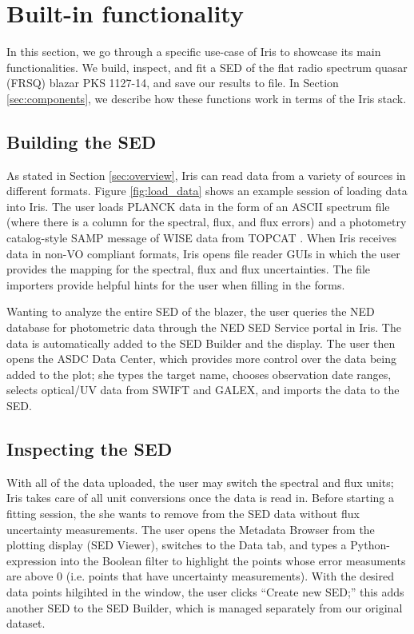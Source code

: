 \section{Built-in functionality}
\label{sec:builtin}

In this section, we go through a specific use-case of Iris to showcase its main functionalities. We build, inspect, and fit a SED of the flat radio spectrum quasar (FRSQ) blazar PKS 1127-14, and save our results to file. In Section \ref{sec:components}, we describe how these functions work in terms of the Iris stack.

\subsection{Building the SED}

As stated in Section \ref{sec:overview}, Iris can read data from a variety of sources in different formats. Figure \ref{fig:load_data} shows an example session of loading data into Iris. The user loads PLANCK data in the form of an ASCII spectrum file (where there is a column for the spectral, flux, and flux errors) and a photometry catalog-style SAMP message of WISE data from TOPCAT \citep{2005ASPC..347...29T}. When Iris receives data in non-VO compliant formats, Iris opens file reader GUIs in which the user provides the mapping for the spectral, flux and flux uncertainties. The file importers provide helpful hints for the user when filling in the forms.

Wanting to analyze the entire SED of the blazer, the user queries the NED database for photometric data through the NED SED Service portal in Iris. The data is automatically added to the SED Builder and the display. The user then opens the ASDC Data Center, which provides more control over the data being added to the plot; she types the target name, chooses observation date ranges, selects optical/UV data from SWIFT and GALEX, and imports the data to the SED.

\subsection{Inspecting the SED}

With all of the data uploaded, the user may switch the spectral and flux units; Iris takes care of all unit conversions once the data is read in. Before starting a fitting session, the she wants to remove from the SED data without flux uncertainty measurements. The user opens the Metadata Browser from the plotting display (SED Viewer), switches to the Data tab, and types a Python-expression into the Boolean filter to highlight the points whose error measuments are above 0 (i.e. points that have uncertainty measurements). With the desired data points hilgihted in the window, the user clicks ``Create new SED;'' this adds another SED to the SED Builder, which is managed separately from our original dataset.

